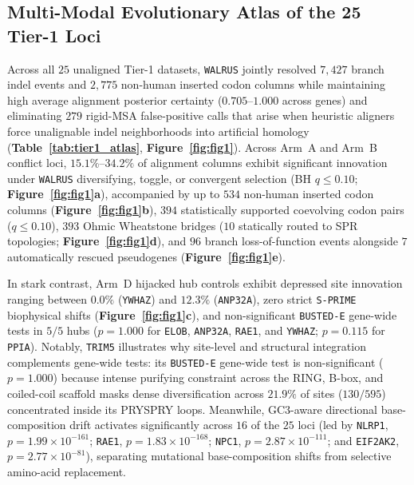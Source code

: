 \documentclass[11pt,letterpaper]{article}
\newcommand{\WALRUS}{\texttt{WALRUS}\xspace}
\newcommand{\BUSTEDE}{\texttt{BUSTED-E}\xspace}
\newcommand{\SPRIME}{\texttt{S-PRIME}\xspace}
\begin{document}
\subsection{Multi-Modal Evolutionary Atlas of the 25 Tier-1 Loci}

Across all $25$ unaligned Tier-1 datasets, \WALRUS jointly resolved $7,427$ branch indel events and $2,775$ non-human inserted codon columns while maintaining high average alignment posterior certainty ($0.705$--$1.000$ across genes) and eliminating $279$ rigid-MSA false-positive calls that arise when heuristic aligners force unalignable indel neighborhoods into artificial homology (\textbf{Table~\ref{tab:tier1_atlas}}, \textbf{Figure~\ref{fig:fig1}}). Across Arm~A and Arm~B conflict loci, $15.1\%$--$34.2\%$ of alignment columns exhibit significant innovation under \WALRUS diversifying, toggle, or convergent selection (BH $q \le 0.10$; \textbf{Figure~\ref{fig:fig1}a}), accompanied by up to $534$ non-human inserted codon columns (\textbf{Figure~\ref{fig:fig1}b}), $394$ statistically supported coevolving codon pairs ($q \le 0.10$), $393$ Ohmic Wheatstone bridges ($10$ statically routed to SPR topologies; \textbf{Figure~\ref{fig:fig1}d}), and $96$ branch loss-of-function events alongside $7$ automatically rescued pseudogenes (\textbf{Figure~\ref{fig:fig1}e}).

In stark contrast, Arm~D hijacked hub controls exhibit depressed site innovation ranging between $0.0\%$ (\texttt{YWHAZ}) and $12.3\%$ (\texttt{ANP32A}), zero strict \SPRIME biophysical shifts (\textbf{Figure~\ref{fig:fig1}c}), and non-significant \BUSTEDE gene-wide tests in $5/5$ hubs ($p = 1.000$ for \texttt{ELOB}, \texttt{ANP32A}, \texttt{RAE1}, and \texttt{YWHAZ}; $p = 0.115$ for \texttt{PPIA}). Notably, \texttt{TRIM5} illustrates why site-level and structural integration complements gene-wide tests: its \BUSTEDE gene-wide test is non-significant ($p = 1.000$) because intense purifying constraint across the RING, B-box, and coiled-coil scaffold masks dense diversification across $21.9\%$ of sites ($130/595$) concentrated inside its PRYSPRY loops. Meanwhile, GC3-aware directional base-composition drift activates significantly across $16$ of the $25$ loci (led by \texttt{NLRP1}, $p = 1.99 \times 10^{-161}$; \texttt{RAE1}, $p = 1.83 \times 10^{-168}$; \texttt{NPC1}, $p = 2.87 \times 10^{-111}$; and \texttt{EIF2AK2}, $p = 2.77 \times 10^{-81}$), separating mutational base-composition shifts from selective amino-acid replacement.


\end{document}

